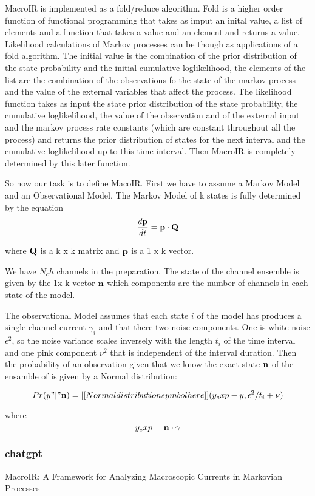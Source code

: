 \documentclass[pdflatex,sn-mathphys-num]{sn-jnl}%
\theoremstyle{thmstyleone}%
\theoremstyle{thmstyletwo}%
\theoremstyle{thmstylethree}%
\begin{document}
MacroIR is implemented as a fold/reduce algorithm. Fold is a higher order function of functional programming that takes as imput an inital value, a list of elements and a function that takes  a value and an element and returns a value. Likelihood calculations of Markov processes can be though as applications of a fold algorithm. The initial value is the combination of the prior distribution of the state probability and the initial cumulative loglikelihood, the elements of the list are the combination of the observations fo the state of the markov process and the value of the external variables that affect the process. The likelihood function takes as input the state prior distribution of the state probability, the cumulative loglikelihood, the value of the observation and of the external input and the markov process rate constants (which are constant throughout all the process) and returns the prior distribution of states for the next interval and the cumulative loglikelihood up to this time interval. 
Then MacroIR is completely determined by this later function. 

So now our task is to define MacoIR. 
First we have to assume a Markov Model and an Observational Model. 
The Markov Model of k states is fully determined by the equation
$$\frac{d \bold p}{dt} = \bold p \cdot \bold Q$$

where $\bold Q$ is a k x k matrix and $\bold p$ is a 1 x k vector. 

We have $N_ch$ channels in the preparation. 
The state of the channel ensemble is given by the 1x k vector $\bold n$ which components are the number of channels in each state of the model. 

The observational Model assumes that each state $i$ of the model has produces a single channel current $\gamma_i$ and that there two noise components. One is white noise $\epsilon^2$, so the noise variance scales inversely with the length $t_i$ of the time interval and one pink component $\nu^2$ that is independent of the interval duration. Then the probability of an observation given that we know the exact state $\bold n$ of the ensamble of is given by a Normal distribution: 


$$ Pr(y "|" \bold n) = [[Normal distribution symbol here]] (y_exp - y, \epsilon^2/t_i + \nu)$$

where 
$$ y_exp = \bold n \cdot \bold \gamma$$ 
\subsubsection{chatgpt}
MacroIR: A Framework for Analyzing Macroscopic Currents in Markovian Processes
\end{document}

